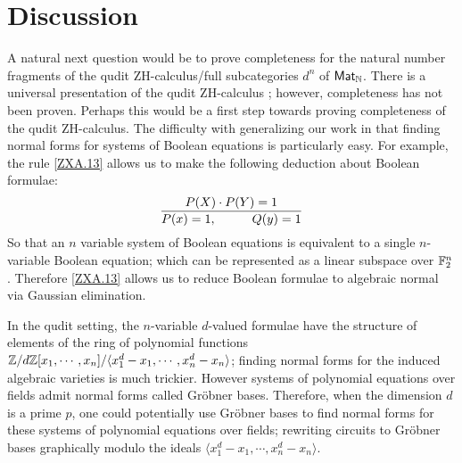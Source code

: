 
\section{Discussion}
A natural next question would be to prove completeness for the natural number fragments of the qudit ZH-calculus/full subcategories $d^n$ of $\mathsf{Mat}_{\mathbb{N}}$.  There is a universal presentation of the qudit ZH-calculus \cite{roy}; however, completeness has not been proven.  Perhaps this would be a first step towards proving completeness of the qudit ZH-calculus.  The difficulty with generalizing our work in that finding normal forms for systems of Boolean equations is particularly easy.  For example, the rule \ref{ZXA.13} allows us to make the following deduction about Boolean formulae:
$$
\dfrac{P(X)\cdot P(Y)=1}{P(x)=1,\hspace*{1cm}Q(y)=1}
$$
So that an $n$ variable system of Boolean equations is equivalent to a single $n$-variable Boolean equation; which can be represented as a linear subspace over $\mathbb{F}_2^n$. Therefore \ref{ZXA.13} allows us to  reduce Boolean formulae to algebraic normal via  Gaussian elimination.
 
In the qudit setting, the $n$-variable $d$-valued formulae have the structure of elements of the ring of polynomial functions $\mathbb{Z}/d\mathbb{Z}[x_1,\cdots, x_{n}]/\langle x_1^d-x_1,\cdots, x_n^d-x_n\rangle$; finding normal forms for the induced algebraic varieties is much trickier. 
However systems of polynomial equations over fields admit normal forms called Gr\"obner bases.  Therefore,  when the dimension $d$ is a prime $p$, one could potentially use  Gr\"obner bases to find normal forms for these systems of polynomial equations over fields; rewriting circuits to    Gr\"obner bases  graphically modulo the  ideals $\langle x_1^d-x_1,\cdots, x_n^d-x_n\rangle$.  
